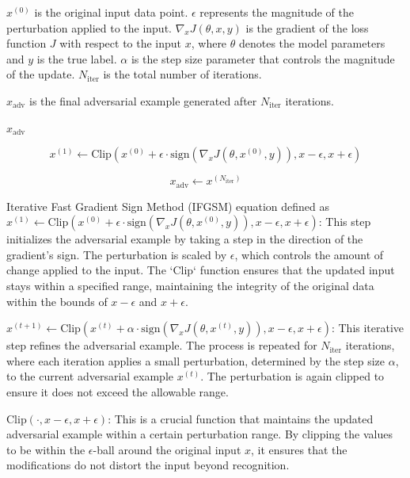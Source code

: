 
\( x^{(0)} \) is the original input data point.
\( \epsilon \) represents the magnitude of the perturbation applied to the input.
\( \nabla_x J(\theta, x, y) \) is the gradient of the loss function \( J \) with respect to the input \( x \), where \( \theta \) denotes the model parameters and \( y \) is the true label.
\( \alpha \) is the step size parameter that controls the magnitude of the update.
\( N_{\text{iter}} \) is the total number of iterations.

\( x_{\text{adv}} \) is the final adversarial example generated after \( N_{\text{iter}} \) iterations.

\begin{algorithm}
    \( x_{\text{adv}} \)

    \[
    x^{(1)} \leftarrow \text{Clip}\left(x^{(0)} + \epsilon \cdot \text{sign}(\nabla_x J(\theta, x^{(0)}, y)), x - \epsilon, x + \epsilon\right)
    \]


    \[
    x_{\text{adv}} \leftarrow x^{(N_{\text{iter}})}
    \]
\end{algorithm}

Iterative Fast Gradient Sign Method (IFGSM) equation defined as
\( x^{(1)} \leftarrow \text{Clip}\left(x^{(0)} + \epsilon \cdot \text{sign}(\nabla_x J(\theta, x^{(0)}, y)), x - \epsilon, x + \epsilon\right) \): 
This step initializes the adversarial example by taking a step in the direction of the gradient's sign.
The perturbation is scaled by \( \epsilon \), which controls the amount of change applied to the input.
The `Clip` function ensures that the updated input stays within a specified range, maintaining the integrity of the original data within the bounds of \( x - \epsilon \) and \( x + \epsilon \).

\( x^{(t+1)} \leftarrow \text{Clip}\left(x^{(t)} + \alpha \cdot \text{sign}(\nabla_x J(\theta, x^{(t)}, y)), x - \epsilon, x + \epsilon\right) \): 
This iterative step refines the adversarial example.
The process is repeated for \( N_{\text{iter}} \) iterations, where each iteration applies a small perturbation, determined by the step size \( \alpha \), to the current adversarial example \( x^{(t)} \).
The perturbation is again clipped to ensure it does not exceed the allowable range.

\( \text{Clip}(\cdot, x - \epsilon, x + \epsilon) \): 
This is a crucial function that maintains the updated adversarial example within a certain perturbation range.
By clipping the values to be within the \( \epsilon \)-ball around the original input \( x \), it ensures that the modifications do not distort the input beyond recognition.